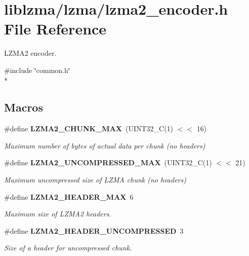 \section{liblzma/lzma/lzma2\-\_\-encoder.h File Reference}
\label{lzma2__encoder_8h}


L\-Z\-M\-A2 encoder.  


{\ttfamily \#include \char`\"{}common.\-h\char`\"{}}\\*
\subsection*{Macros}
\begin{DoxyCompactItemize}
\item 
\#define {\bf L\-Z\-M\-A2\-\_\-\-C\-H\-U\-N\-K\-\_\-\-M\-A\-X}~(U\-I\-N\-T32\-\_\-\-C(1) $<$$<$ 16)
\begin{DoxyCompactList}\small\item\em Maximum number of bytes of actual data per chunk (no headers) \end{DoxyCompactList}\item 
\#define {\bf L\-Z\-M\-A2\-\_\-\-U\-N\-C\-O\-M\-P\-R\-E\-S\-S\-E\-D\-\_\-\-M\-A\-X}~(U\-I\-N\-T32\-\_\-\-C(1) $<$$<$ 21)
\begin{DoxyCompactList}\small\item\em Maximum uncompressed size of L\-Z\-M\-A chunk (no headers) \end{DoxyCompactList}\item 
\#define {\bf L\-Z\-M\-A2\-\_\-\-H\-E\-A\-D\-E\-R\-\_\-\-M\-A\-X}~6
\begin{DoxyCompactList}\small\item\em Maximum size of L\-Z\-M\-A2 headers. \end{DoxyCompactList}\item 
\#define {\bf L\-Z\-M\-A2\-\_\-\-H\-E\-A\-D\-E\-R\-\_\-\-U\-N\-C\-O\-M\-P\-R\-E\-S\-S\-E\-D}~3
\begin{DoxyCompactList}\small\item\em Size of a header for uncompressed chunk. \end{DoxyCompactList}\end{DoxyCompactItemize}
